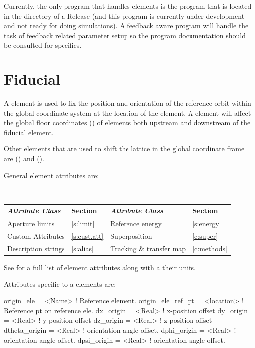 Currently, the only program that handles  elements is the  program that
is located in the  directory of a  Release (and this program is currently under
development and not ready for doing simulations). A feedback aware program will handle the task
of feedback related parameter setup so the program documentation should be consulted for specifics.

\newpage

\section{Fiducial}
\label{s:fiducial}

A  element is used to fix the position and orientation of the reference orbit within
the global coordinate system at the location of the  element. A  element
will affect the global floor coordinates () of elements both upstream and downstream
of the fiducial element.

Other elements that are used to shift the lattice in the global coordinate frame are
 () and  ().

General  element attributes are:
\begin{center}
\tt
\begin{tabular}{llll} \toprule
  {\sl Attribute Class}      & Section           & {\sl Attribute Class}      & Section         \\ \midrule
  Aperture limits            & \ref{s:limit}     & Reference energy           & \ref{s:energy}  \\
  Custom Attributes          & \ref{s:cust.att}  & Superposition              & \ref{c:super}   \\
  Description strings        & \ref{s:alias}     & Tracking \& transfer map   & \ref{c:methods} \\ 
  \bottomrule
\end{tabular}
\end{center}
\toffset
See  for a full list of element attributes along with a their units.

Attributes specific to a  elements are:
\begin{example}
  origin_ele        = <Name>     ! Reference element.
  origin_ele_ref_pt = <location> ! Reference pt on reference ele.
  dx_origin         = <Real>     ! x-position offset
  dy_origin         = <Real>     ! y-position offset
  dz_origin         = <Real>     ! z-position offset
  dtheta_origin     = <Real>     ! orientation angle offset.
  dphi_origin       = <Real>     ! orientation angle offset.
  dpsi_origin       = <Real>     ! orientation angle offset.
\end{example}

